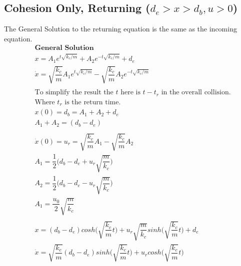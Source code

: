 \documentclass[a4paper,11pt,titlepage]{report}
\begin{document}
\subsection{Cohesion Only, Returning ($d_e > x > d_b, u > 0$)}
\label{sec:cohesion only returning}
The General Solution to the returning equation is the same as the incoming equation.
\begin{align*}
&\textbf{General Solution} \\
&x = A_1 e^{t \sqrt{k_c / m}} + A_2 e^{- t \sqrt{k_c / m}} + d_e \\
&\dot{x} = \sqrt{\dfrac{k_c}{m}} A_1 e^{t \sqrt{k_c / m}} - \sqrt{\dfrac{k_c}{m}} A_2 e^{- t \sqrt{k_c / m}} \\\\
&\text{To simplify the result the $t$ here is $t - t_r$ in the overall collision.} \\
&\text{Where $t_r$ is the return time.} \\
&x(0) = d_b = A_1 + A_2 + d_e \\
&A_1 + A_2 = (d_b - d_e)\\\\
&\dot{x}(0) = u_r = \sqrt{\dfrac{k_c}{m}} A_1 - \sqrt{\dfrac{k_c}{m}} A_2 \\
&A_1 = \dfrac{1}{2}\Big(d_b - d_e + u_r \sqrt{\dfrac{m}{k_c}} \Big) \\
&A_2 = \dfrac{1}{2}\Big(d_b - d_e - u_r \sqrt{\dfrac{m}{k_c}} \Big) \\
&A_1 = \dfrac{u_0}{2} \sqrt{\dfrac{m}{k_c}} \\\\
&x = (d_b - d_e)cosh\Big(\sqrt{\dfrac{k_c}{m}} t\Big) + u_r \sqrt{\dfrac{m}{k_c}} sinh\Big(\sqrt{\dfrac{k_c}{m}}t\Big) + d_e \\
&\dot{x} = \sqrt{\dfrac{k_c}{m}}(d_b - d_e)sinh\Big(\sqrt{\dfrac{k_c}{m}} t\Big) + u_r cosh\Big(\sqrt{\dfrac{k_c}{m}}t\Big) \\
\end{align*}
\end{document}
